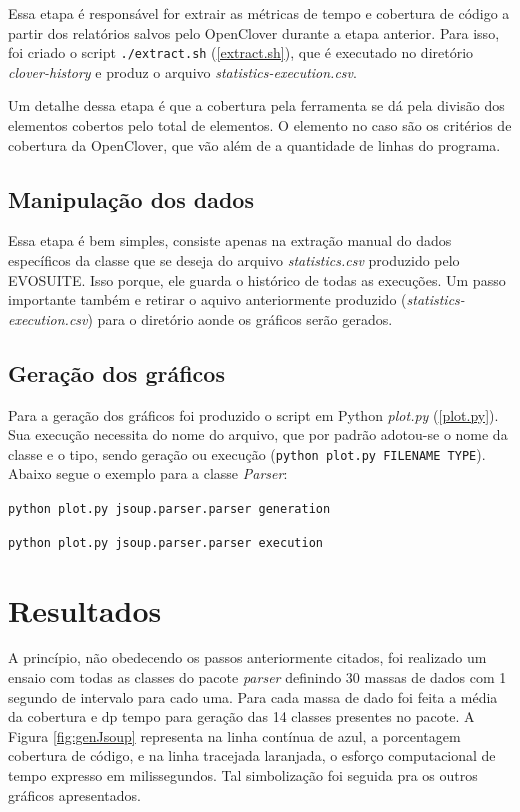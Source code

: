 Essa etapa é responsável for extrair as métricas de tempo e cobertura de código a partir dos relatórios salvos pelo OpenClover durante a etapa anterior. Para isso, foi criado o script \texttt{./extract.sh} (\ref{extract.sh}), que é executado no diretório \textit{clover-history} e produz o arquivo \textit{statistics-execution.csv}. 

Um detalhe dessa etapa é que a cobertura pela ferramenta se dá pela divisão dos elementos cobertos pelo total de elementos. O elemento no caso são os critérios de cobertura da OpenClover, que vão além de a quantidade de linhas do programa.

\subsection{Manipulação dos dados}

Essa etapa é bem simples, consiste apenas na extração manual do dados específicos da classe que se deseja do arquivo \textit{statistics.csv} produzido pelo EVOSUITE. Isso porque, ele guarda o histórico de todas as execuções. Um passo importante também e retirar o aquivo anteriormente produzido (\textit{statistics-execution.csv}) para o diretório aonde os gráficos serão gerados.

\subsection{Geração dos gráficos} 

Para a geração dos gráficos foi produzido o script em Python \textit{plot.py} (\ref{plot.py}). Sua execução necessita do nome do arquivo, que por padrão adotou-se o nome da classe e o tipo, sendo geração ou execução (\texttt{python plot.py FILENAME TYPE}). Abaixo segue o exemplo para a classe \textit{Parser}:

\texttt{python plot.py jsoup.parser.parser generation} 
 
\texttt{python plot.py jsoup.parser.parser execution}

\section{Resultados \label{sec:resultados}}

A princípio, não obedecendo os passos anteriormente citados, foi realizado um ensaio com todas as classes do pacote \textit{parser} definindo 30 massas de dados com 1 segundo de intervalo para cado uma. Para cada massa de dado foi feita a média da cobertura e dp tempo para geração das 14 classes presentes no pacote. A Figura \ref{fig:genJsoup} representa na linha contínua de azul, a porcentagem cobertura de código, e na linha tracejada laranjada, o esforço computacional de tempo expresso em milissegundos. Tal simbolização foi seguida pra os outros gráficos apresentados.

